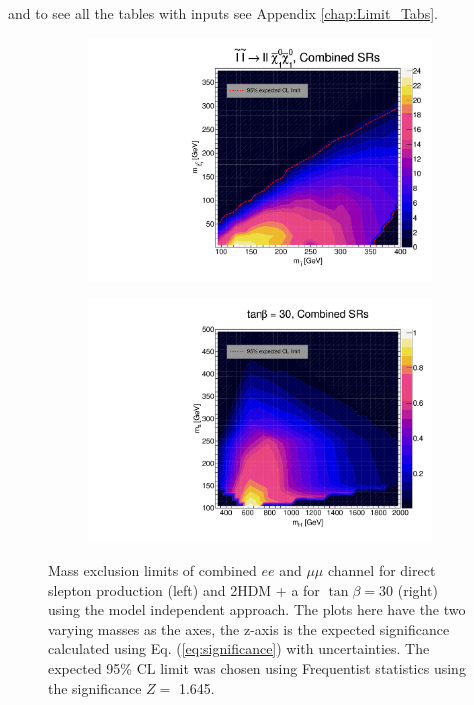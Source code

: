 \documentclass[12pt, a4paper]{book}
\begin{document}
and to see all the tables with inputs see Appendix \ref{chap:Limit_Tabs}.
\begin{figure}[!ht]
	\centering
	\begin{subfigure}[b]{0.49\textwidth}
      \centering
      \includegraphics[width=1\textwidth]{Limits/Model_independent/SlepSlep/SlepSlep_ll.pdf}
   \end{subfigure}
   \hfill
   \begin{subfigure}[b]{0.49\textwidth}
      \centering
      \includegraphics[width=1\textwidth]{Limits/Model_independent/2HDM/2HDM_ll_tb30.pdf}
   \end{subfigure}
   \caption[Mass exclusion limits of combined $ee$ and $\mu\mu$ channel for direct slepton production and 2HDM + a using the model independent approach]{
      Mass exclusion limits of combined $ee$ and $\mu\mu$ channel for direct slepton production (left) and 2HDM + a for $\tan\beta=30$ (right) using the model independent approach. The plots here have the two varying masses as the axes, the z-axis is the expected significance calculated using Eq. (\ref{eq:significance}) with uncertainties. The expected 95\% CL limit was chosen using Frequentist statistics using the significance $Z=$ 1.645.   
}
\end{figure}
\end{document}
